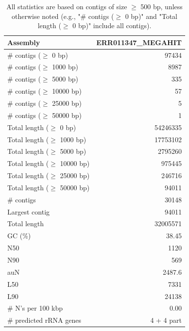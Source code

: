 \documentclass[12pt,a4paper]{article}
\begin{document}
\begin{table}[ht]
\begin{center}
\caption{All statistics are based on contigs of size $\geq$ 500 bp, unless otherwise noted (e.g., "\# contigs ($\geq$ 0 bp)" and "Total length ($\geq$ 0 bp)" include all contigs).}
\begin{tabular}{|l*{1}{|r}|}
\hline
Assembly & ERR011347\_MEGAHIT \\ \hline
\# contigs ($\geq$ 0 bp) & 97434 \\ \hline
\# contigs ($\geq$ 1000 bp) & 8987 \\ \hline
\# contigs ($\geq$ 5000 bp) & 335 \\ \hline
\# contigs ($\geq$ 10000 bp) & 57 \\ \hline
\# contigs ($\geq$ 25000 bp) & 5 \\ \hline
\# contigs ($\geq$ 50000 bp) & 1 \\ \hline
Total length ($\geq$ 0 bp) & 54246335 \\ \hline
Total length ($\geq$ 1000 bp) & 17753102 \\ \hline
Total length ($\geq$ 5000 bp) & 2795260 \\ \hline
Total length ($\geq$ 10000 bp) & 975445 \\ \hline
Total length ($\geq$ 25000 bp) & 246716 \\ \hline
Total length ($\geq$ 50000 bp) & 94011 \\ \hline
\# contigs & 30148 \\ \hline
Largest contig & 94011 \\ \hline
Total length & 32005571 \\ \hline
GC (\%) & 38.45 \\ \hline
N50 & 1120 \\ \hline
N90 & 569 \\ \hline
auN & 2487.6 \\ \hline
L50 & 7331 \\ \hline
L90 & 24138 \\ \hline
\# N's per 100 kbp & 0.00 \\ \hline
\# predicted rRNA genes & 4 + 4 part \\ \hline
\end{tabular}
\end{center}
\end{table}
\end{document}
